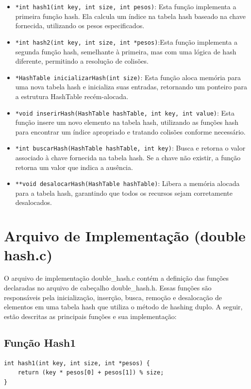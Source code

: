 \documentclass{article}
\begin{document}
 \begin{itemize}

 \item \verb|*int hash1(int key, int size, int pesos)|: Esta função implementa a primeira função hash. Ela calcula um índice na tabela hash baseado na chave fornecida, utilizando os pesos especificados. 

 \item \verb|*int hash2(int key, int size, int *pesos)|:Esta função implementa a segunda função hash, semelhante à primeira, mas com uma lógica de hash diferente, permitindo a resolução de colisões. 

\item \verb|*HashTable inicializarHash(int size)|: Esta função aloca memória para uma nova tabela hash e inicializa suas entradas, retornando um ponteiro para a estrutura HashTable recém-alocada.  

\item \verb|*void inserirHash(HashTable hashTable, int key, int value)|: Esta função insere um novo elemento na tabela hash, utilizando as funções hash para encontrar um índice apropriado e tratando colisões conforme necessário.

\item \verb|*int buscarHash(HashTable hashTable, int key)|: Busca e retorna o valor associado à chave fornecida na tabela hash. Se a chave não existir, a função retorna um valor que indica a ausência.

\item \verb|**void desalocarHash(HashTable hashTable)|: Libera a memória alocada para a tabela hash, garantindo que todos os recursos sejam corretamente desalocados.
 

 \end{itemize}


\section{Arquivo de Implementação (double hash.c)}

O arquivo de implementação double\_hash.c contém a definição das funções declaradas no arquivo de cabeçalho double\_hash.h. Essas funções são responsáveis pela inicialização, inserção, busca, remoção e desalocação de elementos em uma tabela hash que utiliza o método de hashing duplo. A seguir, estão descritas as principais funções e sua implementação: 

\subsection{Função Hash1}
\begin{lstlisting}[caption={},label={lst:cod1},language={[x86masm]Assembler}]
int hash1(int key, int size, int *pesos) {
    return (key * pesos[0] + pesos[1]) % size;
}
\end{lstlisting}
\end{document}
